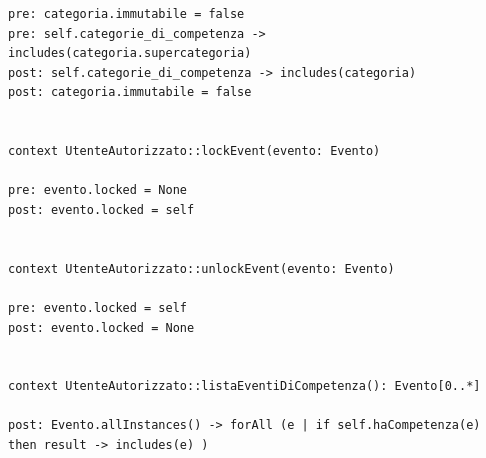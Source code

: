 \documentclass{article}
\begin{document}
\begin{verbatim}
pre: categoria.immutabile = false
pre: self.categorie_di_competenza -> includes(categoria.supercategoria)
post: self.categorie_di_competenza -> includes(categoria)
post: categoria.immutabile = false


context UtenteAutorizzato::lockEvent(evento: Evento)

pre: evento.locked = None
post: evento.locked = self


context UtenteAutorizzato::unlockEvent(evento: Evento)

pre: evento.locked = self
post: evento.locked = None


context UtenteAutorizzato::listaEventiDiCompetenza(): Evento[0..*]

post: Evento.allInstances() -> forAll (e | if self.haCompetenza(e) then result -> includes(e) )
\end{verbatim}
\end{document}
